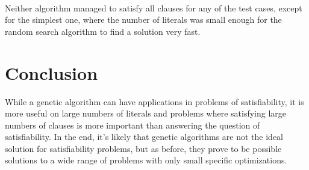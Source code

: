 \documentclass{article}
\begin{document}
\paragraph{}
Neither algorithm managed to satisfy all clauses for any of the test cases, except for the simplest one, where the number of literals was small enough for the random search algorithm to find a solution very fast.

\section{Conclusion}
While a genetic algorithm can have applications in problems of satisfiability, it is more useful on large numbers of literals and problems where satisfying large numbers of clauses is more important than answering the question of satisfiability. In the end, it's likely that genetic algorithms are not the ideal solution for satisfiability problems\cite{harmeling_2000}, but as before, they prove to be possible solutions to a wide range of problems with only small specific optimizations.



\end{document}
